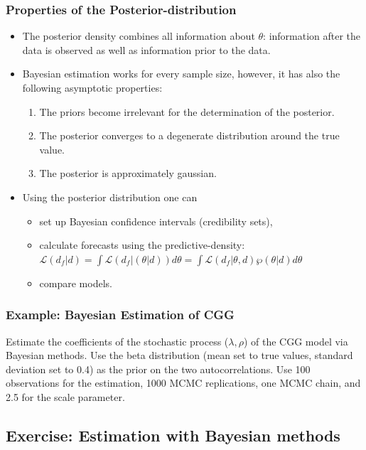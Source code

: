 \documentclass[handout]{beamer}  %
\begin{document}
\begin{frame}\frametitle{Properties of the Posterior-distribution}
	\begin{itemize}
		\item The posterior density combines all information about ${\theta}$: information after the data is observed as well as information prior to the data.
		\item Bayesian estimation works for every sample size, however, it has also the following asymptotic properties:
		\begin{enumerate}
			\item The priors become irrelevant for the determination of the posterior.
			\item The posterior converges to a degenerate distribution around the true value.
			\item The posterior is approximately gaussian.
		\end{enumerate}
		\item Using the posterior distribution one can
		\begin{itemize}
			\item set up Bayesian confidence intervals (credibility sets),
			\item calculate forecasts using the predictive-density: $\mathcal{L}({d_f}|{d})= \int \mathcal{L}({d_f}|({\theta}|{d})){d} {\theta} = \int \mathcal{L}({d_f}|{\theta},{d})\wp({\theta}|{d}){d}{\theta}$
			\item compare models.
		\end{itemize}
	\end{itemize}
\end{frame}

\begin{frame}\frametitle{Example: Bayesian Estimation of CGG}
	Estimate the coefficients of the stochastic process ($\lambda,\rho$) of the CGG model via Bayesian methods. Use the beta distribution (mean set to true values, standard deviation set to 0.4) as the prior on the two autocorrelations. Use 100 observations for the estimation, 1000 MCMC replications, one MCMC chain, and 2.5 for the scale parameter.
\end{frame}

\subsection{Exercise: Estimation with Bayesian methods}
\end{document}
